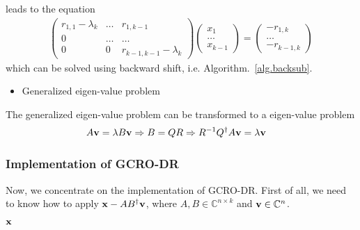 leads to the equation
\begin{equation}
\begin{split}
\left(\begin{array}{ccccc}
r_{1,1}-\lambda_k & \ldots & r_{1,k-1} \\
                0 & \ldots & \ldots    \\
                0 &      0 & r_{k-1,k-1}-\lambda _k
\end{array}\right)
\left(\begin{array}{c} x_1 \\ \ldots \\ x_{k-1} \end{array}\right)=\left(\begin{array}{c} -r_{1,k} \\ \ldots \\ -r_{k-1,k} \end{array}\right)
\end{split}
\end{equation}
which can be solved using backward shift, i.e. Algorithm.~\ref{alg.backsub}.

\begin{itemize}
  \item {}Generalized eigen-value problem
\end{itemize}

The generalized eigen-value problem can be transformed to a eigen-value problem
\begin{equation}
\begin{split}
&A{\bf v}=\lambda B{\bf v} \Rightarrow B=QR \Rightarrow R^{-1}Q^{\dagger}A {\bf v}=\lambda {\bf v}
\end{split}
\end{equation}

\subsubsection{\label{sec:implementationgcrodr}Implementation of GCRO-DR}

Now, we concentrate on the implementation of GCRO-DR. First of all, we need to know how to apply ${\bf x}-AB^{\dagger}{\bf v}$, where $A,B\in \mathbb{C}^{n\times k}$ and ${\bf v}\in \mathbb{C}^n$.
\begin{algorithm}[H]
\begin{algorithmic}
\EndFor

\Return $\bf x$
\end{algorithmic}
\caption{${\bf x}={\bf x}-AB^{\dagger}{\bf v}$}
\end{algorithm}

